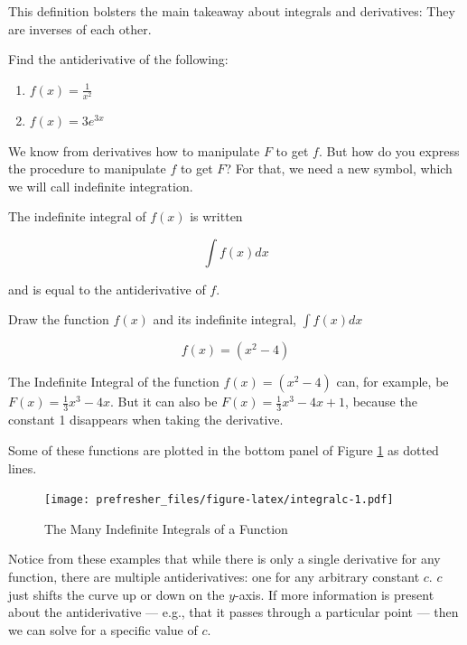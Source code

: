 \documentclass[]{book}
\providecommand{\tightlist}{%
  \setlength{\itemsep}{0pt}\setlength{\parskip}{0pt}}
\theoremstyle{definition}
\theoremstyle{definition}
\theoremstyle{definition}
\theoremstyle{remark}
\let\BeginKnitrBlock\begin \let\EndKnitrBlock\end
\begin{document}
This definition bolsters the main takeaway about integrals and
derivatives: They are inverses of each other.

\BeginKnitrBlock{exercise}[Antiderivative]
\protect\hypertarget{exr:unnamed-chunk-21}{}{\label{exr:unnamed-chunk-21}
{} }Find the antiderivative of the
following:

\begin{enumerate}
\def\labelenumi{\arabic{enumi}.}
\tightlist
\item
  \(f(x) = \frac{1}{x^2}\)
\item
  \(f(x) = 3e^{3x}\)
\end{enumerate}
\EndKnitrBlock{exercise}

We know from derivatives how to manipulate \(F\) to get \(f\). But how
do you express the procedure to manipulate \(f\) to get \(F\)? For that,
we need a new symbol, which we will call indefinite integration.

\BeginKnitrBlock{definition}[Indefinite Integral]
\protect\hypertarget{def:unnamed-chunk-22}{}{\label{def:unnamed-chunk-22}
{} }The indefinite integral of
\(f(x)\) is written

\[\int f(x) dx \]

and is equal to the antiderivative of \(f\).
\EndKnitrBlock{definition}

\BeginKnitrBlock{example}
\protect\hypertarget{exm:unnamed-chunk-23}{}{\label{exm:unnamed-chunk-23}
}Draw the function \(f(x)\) and its indefinite integral,
\(\int\limits f(x) dx\)

\[f(x) = (x^2-4)\]
\EndKnitrBlock{example}

\BeginKnitrBlock{solution}
{}The Indefinite Integral of the function
\(f(x) = (x^2-4)\) can, for example, be \(F(x) = \frac{1}{3}x^3 - 4x.\)
But it can also be \(F(x) = \frac{1}{3}x^3 - 4x + 1\), because the
constant 1 disappears when taking the derivative.
\EndKnitrBlock{solution}

Some of these functions are plotted in the bottom panel of Figure
\ref{fig:integralc} as dotted lines.

\begin{figure}
\centering
\texttt{[image: prefresher\_files/figure-latex/integralc-1.pdf]}
\caption{\label{fig:integralc}The Many Indefinite Integrals of a Function}
\end{figure}

Notice from these examples that while there is only a single derivative
for any function, there are multiple antiderivatives: one for any
arbitrary constant \(c\). \(c\) just shifts the curve up or down on the
\(y\)-axis. If more information is present about the antiderivative ---
e.g., that it passes through a particular point --- then we can solve
for a specific value of \(c\).
\end{document}
